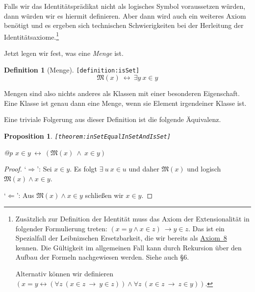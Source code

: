 \documentclass[a4paper,german,10pt,twoside]{book}
\newtheorem{prop}[thm]{Proposition}
\theoremstyle{definition}
\newtheorem{defn}{Definition}
\theoremstyle{remark}
\begin{document}
Falls wir das Identit{\"a}tspr{\"a}dikat nicht als logisches Symbol voraussetzen w{\"u}rden, dann w{\"u}rden wir es hiermit definieren. Aber dann wird auch ein weiteres Axiom ben{\"o}tigt und es ergeben sich technischen Schwierigkeiten bei der Herleitung der Identit{\"a}tsaxiome.\footnote{
  Zus{\"a}tzlich zur Definition der Identit{\"a}t muss das Axiom der Extensionalit{\"a}t in folgender Formulierung treten: $(x = y \land x \in z) \ \rightarrow y \in z$. Das ist ein Spezialfall der Leibnizschen Ersetzbarkeit, die wir bereits als \hyperref{http://www.qedeq.org/0_04_07/doc/math/qedeq_logic_v1_de.pdf}{}{axiom:leibnizReplacement}{Axiom~8}~\cite{l} kennen. Die G{\"u}ltigkeit im allgemeinen Fall kann durch Rekursion {\"u}ber den Aufbau der Formeln nachgewiesen werden. Siehe auch \cite{schmidt} \S 6.
  
  \par
  Alternativ k{\"o}nnen wir definieren $(x = y \leftrightarrow (\forall z \ (x \in z \ \rightarrow \ y \in z)) \land \forall z \ (x \in z \ \rightarrow \ z \in y))$.}


\par
Jetzt legen wir fest, was eine \emph{Menge} ist.

\begin{defn}[Menge]
\label{definition:isSet} \hypertarget{definition:isSet}{}
{\tt \tiny [\verb]definition:isSet]]}
$$\mathfrak{M}(x)\ \leftrightarrow\ \exists y\ x \in y$$

\end{defn}

Mengen sind also nichts anderes als Klassen mit einer besonderen Eigenschaft. Eine Klasse ist genau dann eine Menge, wenn sie Element irgendeiner Klasse ist.


\par
Eine triviale Folgerung aus dieser Definition ist die folgende {\"A}quivalenz.

\begin{prop}
\label{theorem:inSetEqualInSetAndIsSet} \hypertarget{theorem:inSetEqualInSetAndIsSet}{}
{\tt \tiny [\verb]theorem:inSetEqualInSetAndIsSet]]}
\mbox{}
\begin{longtable}{{@{\extracolsep{\fill}}p{\linewidth}}}
\centering $x \in y\ \leftrightarrow\ (\mathfrak{M}(x)\ \land\ x \in y)$
\end{longtable}

\end{prop}
\begin{proof}
`$\Rightarrow$': Sei $x \in y$. Es folgt $\exists \ u \ x \in u$ und daher $\mathfrak{M}(x)$ und logisch $\mathfrak{M}(x) \land x \in y$.

\par
`$\Leftarrow$': Aus $\mathfrak{M}(x) \land x \in y$ schlie{\ss}en wir $x \in y$.
\end{proof}
\end{document}
